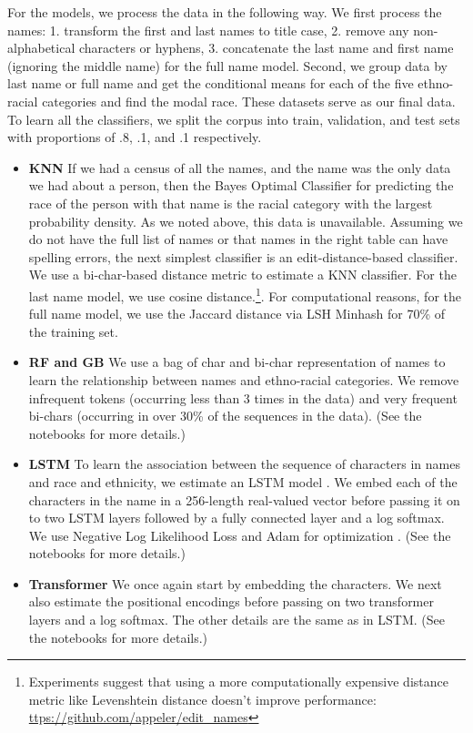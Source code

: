 \documentclass[12pt, letterpaper]{article}
\begin{document}
For the models, we process the data in the following way. We first process the names: 1. transform the first and last names to title case, 2. remove any non-alphabetical characters or hyphens, 3. concatenate the last name and first name (ignoring the middle name) for the full name model. Second, we group data by last name or full name and get the conditional means for each of the five ethno-racial categories and find the modal race. These datasets serve as our final data. To learn all the classifiers, we split the corpus into train, validation, and test sets with proportions of .8, .1, and .1 respectively.

\begin{itemize}

    \item \textbf{KNN} If we had a census of all the names, and the name was the only data we had about a person, then the Bayes Optimal Classifier for predicting the race of the person with that name is the racial category with the largest probability density. As we noted above, this data is unavailable. Assuming we do not have the full list of names or that names in the right table can have spelling errors, the next simplest classifier is an edit-distance-based classifier. We use a bi-char-based distance metric to estimate a KNN classifier. For the last name model, we use cosine distance.\footnote{Experiments suggest that using a more computationally expensive distance metric like Levenshtein distance doesn't improve performance: \url{ttps://github.com/appeler/edit_names}}. For computational reasons, for the full name model, we use the Jaccard distance via LSH Minhash for 70\% of the training set.

    \item \textbf{RF and GB} We use a bag of char and bi-char representation of names to learn the relationship between names and ethno-racial categories. We remove infrequent tokens (occurring less than 3 times in the data) and very frequent bi-chars (occurring in over 30\% of the sequences in the data). (See the notebooks for more details.)
    
    \item \textbf{LSTM} To learn the association between the sequence of characters in names and race and ethnicity, we estimate an LSTM model \citep{graves2005framewise, gers1999learning}. We embed each of the characters in the name in a 256-length real-valued vector before passing it on to two LSTM layers followed by a fully connected layer and a log softmax. We use Negative Log Likelihood Loss and Adam for optimization \citep{kingma2014adam}. (See the notebooks for more details.)

    \item \textbf{Transformer} We once again start by embedding the characters. We next also estimate the positional encodings before passing on two transformer layers and a log softmax. The other details are the same as in LSTM. (See the notebooks for more details.)
    
    \end{itemize}
\end{document}
